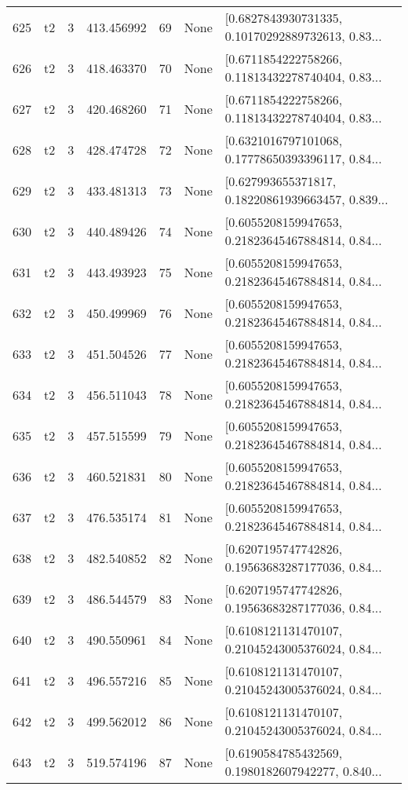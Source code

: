 \begin{tabular}{lllrlll}
625 &  t2 &   3 &   413.456992 &   69 &  None &  [0.6827843930731335, 0.10170292889732613, 0.83... \\
626 &  t2 &   3 &   418.463370 &   70 &  None &  [0.6711854222758266, 0.11813432278740404, 0.83... \\
627 &  t2 &   3 &   420.468260 &   71 &  None &  [0.6711854222758266, 0.11813432278740404, 0.83... \\
628 &  t2 &   3 &   428.474728 &   72 &  None &  [0.6321016797101068, 0.17778650393396117, 0.84... \\
629 &  t2 &   3 &   433.481313 &   73 &  None &  [0.627993655371817, 0.18220861939663457, 0.839... \\
630 &  t2 &   3 &   440.489426 &   74 &  None &  [0.6055208159947653, 0.21823645467884814, 0.84... \\
631 &  t2 &   3 &   443.493923 &   75 &  None &  [0.6055208159947653, 0.21823645467884814, 0.84... \\
632 &  t2 &   3 &   450.499969 &   76 &  None &  [0.6055208159947653, 0.21823645467884814, 0.84... \\
633 &  t2 &   3 &   451.504526 &   77 &  None &  [0.6055208159947653, 0.21823645467884814, 0.84... \\
634 &  t2 &   3 &   456.511043 &   78 &  None &  [0.6055208159947653, 0.21823645467884814, 0.84... \\
635 &  t2 &   3 &   457.515599 &   79 &  None &  [0.6055208159947653, 0.21823645467884814, 0.84... \\
636 &  t2 &   3 &   460.521831 &   80 &  None &  [0.6055208159947653, 0.21823645467884814, 0.84... \\
637 &  t2 &   3 &   476.535174 &   81 &  None &  [0.6055208159947653, 0.21823645467884814, 0.84... \\
638 &  t2 &   3 &   482.540852 &   82 &  None &  [0.6207195747742826, 0.19563683287177036, 0.84... \\
639 &  t2 &   3 &   486.544579 &   83 &  None &  [0.6207195747742826, 0.19563683287177036, 0.84... \\
640 &  t2 &   3 &   490.550961 &   84 &  None &  [0.6108121131470107, 0.21045243005376024, 0.84... \\
641 &  t2 &   3 &   496.557216 &   85 &  None &  [0.6108121131470107, 0.21045243005376024, 0.84... \\
642 &  t2 &   3 &   499.562012 &   86 &  None &  [0.6108121131470107, 0.21045243005376024, 0.84... \\
643 &  t2 &   3 &   519.574196 &   87 &  None &  [0.6190584785432569, 0.1980182607942277, 0.840... \\

\end{tabular}
